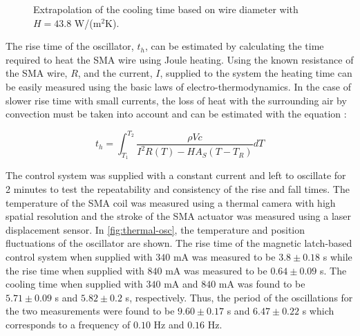 \begin{figure}[htb!] %
  \centering
  \resizebox{0.8\textwidth}{!}{}
  \caption{Extrapolation of the cooling time based on wire diameter with $H = 43.8$ W/(m$^2$K).}
  \label{fig:cooling-time-extrapolation}
\end{figure}

The rise time of the oscillator, $t_h$, can be estimated by calculating the time required to heat the SMA wire using Joule heating. Using the known resistance of the SMA wire, $R$, and the current, $I$, supplied to the system the heating time can be easily measured using the basic laws of electro-thermodynamics. In the case of slower rise time with small currents, the loss of heat with the surrounding air by convection must be taken into account and can be estimated with the equation :

\begin{equation}\label{eq:heatingtime}
  t_h = \int_{T_1}^{T_2} \frac{\rho Vc}{I^2R(T)-HA_S(T-T_R)} dT
\end{equation}

The control system was supplied with a constant current and left to oscillate for 2 minutes to test the repeatability and consistency of the rise and fall times. The temperature of the SMA coil was measured using a thermal camera with high spatial resolution and the stroke of the SMA actuator was measured using a laser displacement sensor. In \cref{fig:thermal-osc}, the temperature and position fluctuations of the oscillator are shown. The rise time of the magnetic latch-based control system when supplied with $340$ mA was measured to be $3.8 \pm 0.18$ s while the rise time when supplied with $840$ mA was measured to be $0.64 \pm 0.09$ s. The cooling time when supplied with $340$ mA and $840$ mA was found to be $5.71 \pm 0.09$ s and $5.82 \pm 0.2$ s, respectively. Thus, the period of the oscillations for the two measurements were found to be $9.60 \pm 0.17$ s and $6.47 \pm 0.22$ s which corresponds to a frequency of $0.10$ Hz and $0.16$ Hz.

